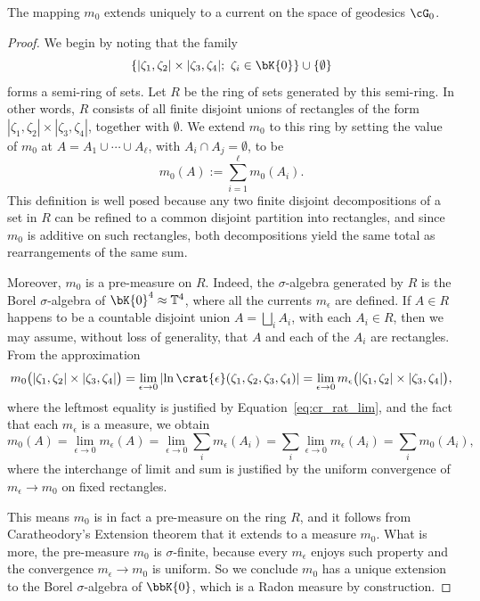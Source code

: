 \documentclass[reqno,11pt]{amsart}
\begin{document}
    \begin{prop}
        The mapping \(m_0\) extends uniquely to a current on the space of geodesics \(\cG_0\).
    \end{prop}
    \begin{proof}
        We begin by noting that the family
        \[
            \left\{|\zeta_1, \zeta_2| \times |\zeta_3, \zeta_4|; \ \zeta_i \in \bK{0}\right\} \cup \{\emptyset\}
        \]
        forms a semi-ring of sets.
        Let \(R\) be the ring of sets generated by this semi-ring.
        In other words, \(R\) consists of all finite disjoint unions of rectangles of the form \(|\zeta_1, \zeta_2| \times |\zeta_3, \zeta_4|\), together with \(\emptyset\).
        We extend \(m_0\) to this ring by setting the value of \(m_0\) at \(A = A_1 \cup \cdots \cup A_\ell\), with \(A_i \cap A_j = \emptyset\), to be
        \[
            m_0(A) := \sum_{i=1}^\ell m_0(A_i).
        \]
        This definition is well posed because any two finite disjoint decompositions of a set in \( R \) can be refined to a common disjoint partition into rectangles, and since \( m_0 \) is additive on such rectangles, both decompositions yield the same total as rearrangements of the same sum.        
        \par Moreover, \(m_0\) is a pre-measure on \(R\).
        Indeed, the \(\sigma\)-algebra generated by \(R\) is the Borel \(\sigma\)-algebra of \(\bK{0}^4 \approx \mathbb{T}^4\), where all the currents \(m_\epsilon\) are defined.
        If \(A \in R\) happens to be a countable disjoint union \(A = \bigsqcup_i A_i\), with each \(A_i \in R\), then we may assume, without loss of generality, that \(A\) and each of the \(A_i\) are rectangles.        
        From the approximation
        \begin{equation}\label{eq:m_0_as_limit}
            m_0\big(|\zeta_1, \zeta_2| \times |\zeta_3, \zeta_4|\big)
            = \lim_{\epsilon \to 0}\left| \ln \crat{\epsilon}(\zeta_1, \zeta_2, \zeta_3, \zeta_4) \right|
            = \lim_{\epsilon \to 0} m_\epsilon\big(|\zeta_1, \zeta_2| \times |\zeta_3, \zeta_4|\big),
        \end{equation}
        where the leftmost equality is justified by Equation~\eqref{eq:cr_rat_lim}, and the fact that each \(m_\epsilon\) is a measure, we obtain
        \[
            m_0(A) = \lim_{\epsilon \to 0} m_\epsilon(A)
                   = \lim_{\epsilon \to 0} \sum_i m_\epsilon(A_i)
                   = \sum_i \lim_{\epsilon \to 0} m_\epsilon(A_i)
                   = \sum_i m_0(A_i),
        \]
        where the interchange of limit and sum is justified by the uniform convergence of \(m_\epsilon \to m_0\) on fixed rectangles.
        \par This means \(m_0\) is in fact a pre-measure on the ring \(R\), and it follows from Caratheodory's Extension theorem that it extends to a measure \(m_0\).
        What is more, the pre-measure \(m_0\) is \(\sigma\)-finite, because every \(m_\epsilon\) enjoys such property and the convergence \(m_\epsilon \to m_0\) is uniform. 
        So we conclude \(m_0\) has a unique extension to the Borel \(\sigma\)-algebra of \(\bbK{0}\), which is a Radon measure by construction.
        

\end{proof}
\end{document}
